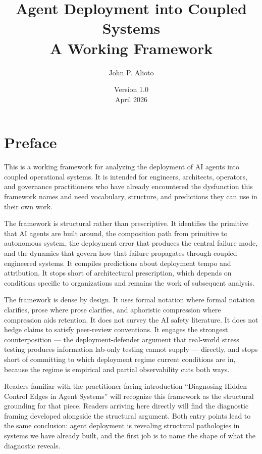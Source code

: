 \documentclass[11pt]{article}
\title{\textbf{Agent Deployment into Coupled Systems}\\[0.3em]
\large A Working Framework}
\author{John P. Alioto}
\date{Version 1.0 \\ April 2026}
\begin{document}
\maketitle

\section*{Preface}

This is a working framework for analyzing the deployment of AI agents into coupled operational systems. It is intended for engineers, architects, operators, and governance practitioners who have already encountered the dysfunction this framework names and need vocabulary, structure, and predictions they can use in their own work.

The framework is structural rather than prescriptive. It identifies the primitive that AI agents are built around, the composition path from primitive to autonomous system, the deployment error that produces the central failure mode, and the dynamics that govern how that failure propagates through coupled engineered systems. It compiles predictions about deployment tempo and attribution. It stops short of architectural prescription, which depends on conditions specific to organizations and remains the work of subsequent analysis.

The framework is dense by design. It uses formal notation where formal notation clarifies, prose where prose clarifies, and aphoristic compression where compression aids retention. It does not survey the AI safety literature. It does not hedge claims to satisfy peer-review conventions. It engages the strongest counterposition --- the deployment-defender argument that real-world stress testing produces information lab-only testing cannot supply --- directly, and stops short of committing to which deployment regime current conditions are in, because the regime is empirical and partial observability cuts both ways.

Readers familiar with the practitioner-facing introduction ``Diagnosing Hidden Control Edges in Agent Systems'' will recognize this framework as the structural grounding for that piece. Readers arriving here directly will find the diagnostic framing developed alongside the structural argument. Both entry points lead to the same conclusion: agent deployment is revealing structural pathologies in systems we have already built, and the first job is to name the shape of what the diagnostic reveals.
\end{document}
